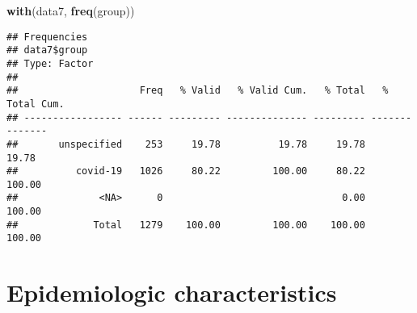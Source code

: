 \documentclass[
]{article}
\newenvironment{Shaded}{\begin{snugshade}}{\end{snugshade}}
\newcommand{\KeywordTok}[1]{\textcolor[rgb]{0.13,0.29,0.53}{\textbf{#1}}}
\newcommand{\NormalTok}[1]{#1}
\begin{document}
\begin{Shaded}
\begin{Highlighting}[]
\KeywordTok{with}\NormalTok{(data7, }\KeywordTok{freq}\NormalTok{(group))}
\end{Highlighting}
\end{Shaded}

\begin{verbatim}
## Frequencies  
## data7$group  
## Type: Factor  
## 
##                     Freq   % Valid   % Valid Cum.   % Total   % Total Cum.
## ----------------- ------ --------- -------------- --------- --------------
##       unspecified    253     19.78          19.78     19.78          19.78
##          covid-19   1026     80.22         100.00     80.22         100.00
##              <NA>      0                               0.00         100.00
##             Total   1279    100.00         100.00    100.00         100.00
\end{verbatim}

\hypertarget{epidemiologic-characteristics}{%
\section{Epidemiologic
characteristics}\label{epidemiologic-characteristics}}
\end{document}
